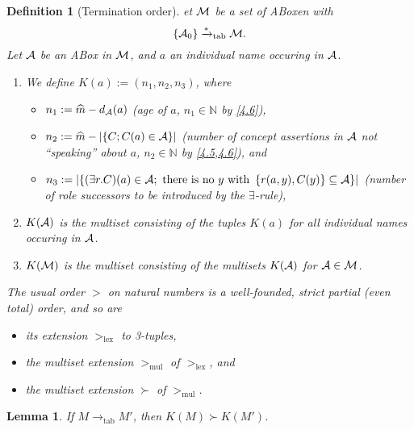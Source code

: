 \documentclass[openany]{scrbook}
\theoremstyle{break}
\newtheorem{Lemma}[Theorem]{Lemma}
\newtheorem{Definition}[Theorem]{Definition}
\theoremstyle{nonumberbreak}
\theoremstyle{nonumberplain}
\theoremstyle{nonumberbreak}
\newcommand{\then}{\Longrightarrow}
\newcommand{\N}{\mathbb{N}}
\newcommand{\abs}[2][]{\left|{#2}\right|\ifx#1\then\else_{#1}\fi}
\newcommand{\set}[1]{\left\{#1\right\}}
\newcommand{\totab}{\to_{\operatorname{tab}}}
\newcommand{\gtlex}{>_{\operatorname{lex}}}
\newcommand{\gtmul}{>_{\operatorname{mul}}}
\begin{document}
\begin{Definition}[Termination order]
  \label{4.7}
  et ${\cal M}$ be a set of ABoxen with
  \begin{equation*}
    \set{{\cal A}_0} \xrightarrow{*}_{\operatorname{tab}} {\cal
      M}.
  \end{equation*}
  Let ${\cal A}$ be an ABox in ${\cal M}$, and $a$ an individual name
  occuring in ${\cal A}$.
  \begin{enumerate}
  \item We define $K(a) := (n_1, n_2, n_3)$, where
    \begin{itemize}
    \item $n_1 := \widehat{m} - d_{\cal A}(a)$ (age of $a$, $n_1 \in
      \N$ by \cref{4.6}),
    \item $n_2 := \widehat{m} - \abs{\set{C; C(a) \in {\cal A}}}$ (number of
      concept assertions in ${\cal A}$ not ``speaking'' about $a$,
      $n_2 \in \N$ by \cref{4.5,4.6}), and
    \item $n_3 := \abs{\set{(\exists r. C)(a) \in {\cal A};\
        \text{there is no}\ y\ \text{with}\ \set{r(a, y), C(y)}
        \subseteq {\cal A}}}$ (number of role successors to be
      introduced by the $\exists$-rule),
    \end{itemize}
  \item $K({\cal A})$ is the multiset consisting of the tuples $K(a)$
    for all individual names occuring in ${\cal A}$.
  \item $K({\cal M})$ is the multiset consisting of the multisets
    $K({\cal A})$ for ${\cal A} \in {\cal M}$.
  \end{enumerate}

  The usual order $>$ on natural numbers is a well-founded, strict
  partial (even total) order, and so are
  \begin{itemize}
  \item its extension $\gtlex$ to 3-tuples,
  \item the multiset extension $\gtmul$ of $\gtlex$, and
  \item the multiset extension $\succ$ of $\gtmul$.
  \end{itemize}
\end{Definition}

\begin{Lemma}
  \label{4.8}
  If $M \totab M'$, then $K(M) \succ K(M')$.
\end{Lemma}
\end{document}
